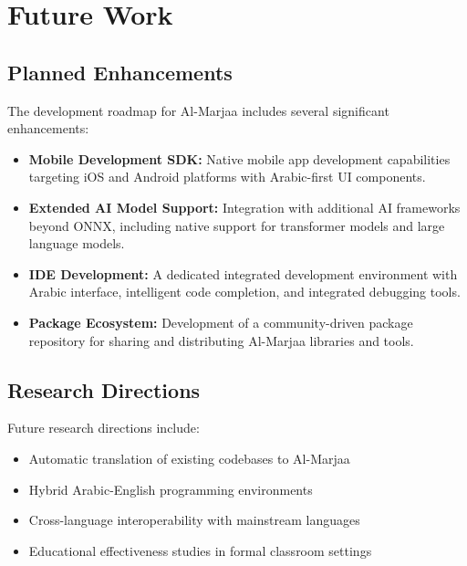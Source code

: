 \documentclass[11pt,a4paper]{article}
\begin{document}
\section{Future Work}

\subsection{Planned Enhancements}

The development roadmap for Al-Marjaa includes several significant enhancements:

\begin{itemize}
    \item \textbf{Mobile Development SDK:} Native mobile app development capabilities targeting iOS and Android platforms with Arabic-first UI components.
    
    \item \textbf{Extended AI Model Support:} Integration with additional AI frameworks beyond ONNX, including native support for transformer models and large language models.
    
    \item \textbf{IDE Development:} A dedicated integrated development environment with Arabic interface, intelligent code completion, and integrated debugging tools.
    
    \item \textbf{Package Ecosystem:} Development of a community-driven package repository for sharing and distributing Al-Marjaa libraries and tools.
\end{itemize}

\subsection{Research Directions}

Future research directions include:
\begin{itemize}
    \item Automatic translation of existing codebases to Al-Marjaa
    \item Hybrid Arabic-English programming environments
    \item Cross-language interoperability with mainstream languages
    \item Educational effectiveness studies in formal classroom settings
\end{itemize}
\end{document}

